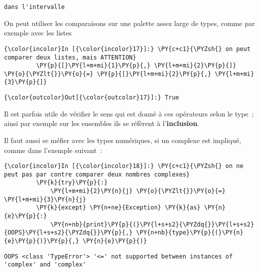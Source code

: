     \begin{Verbatim}[commandchars=\\\{\},frame=single,framerule=0.3mm,rulecolor=\color{cellframecolor}]
dans l'intervalle
\end{Verbatim}

    On peut utiliser les comparaisons sur une palette assez large de types,
comme par exemple avec les listes

    \begin{Verbatim}[commandchars=\\\{\},frame=single,framerule=0.3mm,rulecolor=\color{cellframecolor}]
{\color{incolor}In [{\color{incolor}17}]:} \PY{c+c1}{\PYZsh{} on peut comparer deux listes, mais ATTENTION}
         \PY{p}{[}\PY{l+m+mi}{1}\PY{p}{,} \PY{l+m+mi}{2}\PY{p}{]} \PY{o}{\PYZlt{}}\PY{o}{=} \PY{p}{[}\PY{l+m+mi}{2}\PY{p}{,} \PY{l+m+mi}{3}\PY{p}{]}
\end{Verbatim}


\begin{Verbatim}[commandchars=\\\{\},frame=single,framerule=0.3mm,rulecolor=\color{cellframecolor}]
{\color{outcolor}Out[{\color{outcolor}17}]:} True
\end{Verbatim}
            
    Il est parfois utile de vérifier le sens qui est donné à ces opérateurs
selon le type~; ainsi par exemple sur les ensembles ils se réfèrent à
l'\textbf{inclusion}.

Il faut aussi se méfier avec les types numériques, si un complexe est
impliqué, comme dans l'exemple suivant~:

    \begin{Verbatim}[commandchars=\\\{\},frame=single,framerule=0.3mm,rulecolor=\color{cellframecolor}]
{\color{incolor}In [{\color{incolor}18}]:} \PY{c+c1}{\PYZsh{} on ne peut pas par contre comparer deux nombres complexes}
         \PY{k}{try}\PY{p}{:}
             \PY{l+m+mi}{2}\PY{n}{j} \PY{o}{\PYZlt{}}\PY{o}{=} \PY{l+m+mi}{3}\PY{n}{j}
         \PY{k}{except} \PY{n+ne}{Exception} \PY{k}{as} \PY{n}{e}\PY{p}{:}
             \PY{n+nb}{print}\PY{p}{(}\PY{l+s+s2}{\PYZdq{}}\PY{l+s+s2}{OOPS}\PY{l+s+s2}{\PYZdq{}}\PY{p}{,} \PY{n+nb}{type}\PY{p}{(}\PY{n}{e}\PY{p}{)}\PY{p}{,} \PY{n}{e}\PY{p}{)}
\end{Verbatim}


    \begin{Verbatim}[commandchars=\\\{\},frame=single,framerule=0.3mm,rulecolor=\color{cellframecolor}]
OOPS <class 'TypeError'> '<=' not supported between instances of 'complex' and 'complex'
\end{Verbatim}

